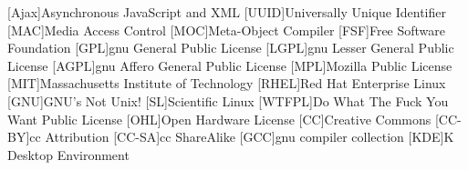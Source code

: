 \begin{acronym}[WYSIWYG]
[Ajax]{Asynchronous JavaScript and XML}
[UUID]{Universally Unique Identifier}
[MAC]{Media Access Control}
[MOC]{Meta-Object Compiler}
[FSF]{Free Software Foundation}
[GPL]{\acs{gnu} General Public License}
[LGPL]{\acs{gnu} Lesser General Public License}
[AGPL]{\acs{gnu} Affero General Public License}
[MPL]{Mozilla Public License}
[MIT]{Massachusetts Institute of Technology}
[RHEL]{Red Hat Enterprise Linux}
[GNU]{GNU's Not Unix!}
[SL]{Scientific Linux}
[WTFPL]{Do What The Fuck You Want Public License}
[OHL]{Open Hardware License}
[CC]{Creative Commons}
[CC-BY]{\acl{cc} Attribution}
[CC-SA]{\acl{cc} ShareAlike}
[GCC]{\acs{gnu} compiler collection}
[KDE]{K Desktop Environment}
\end{acronym}
